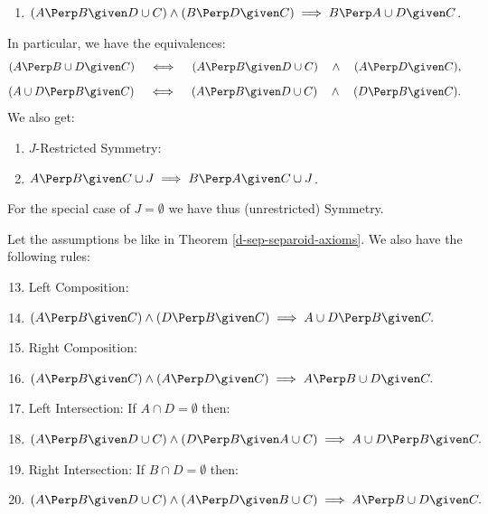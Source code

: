 \begin{DefThm}
\begin{enumerate}[label=\alph*)]
\item[] $ (A \Perp  B \given D \cup C) \land (B \Perp  D \given C) \implies B \Perp  A \cup D \given C$.
\end{enumerate}
In particular, we have the equivalences:
$$ (A \Perp  B \cup D \given C) \quad\iff\quad (A \Perp  B \given D \cup C) \quad\land\quad (A \Perp  D \given C)  ,$$
$$ (A \cup D \Perp  B \given C) \quad\iff\quad (A \Perp  B \given D \cup C) \quad\land\quad (D \Perp  B \given C).$$
We also get:
\begin{enumerate}[resume,label=\alph*)]
    \item $J$-Restricted Symmetry: 
	\item[] $A \Perp  B \given C \cup J \implies B \Perp A \given C \cup J$. 
\end{enumerate}
For the special case of $J=\emptyset$ we have thus (unrestricted) Symmetry.
\end{DefThm}


\begin{Rem}
Let the assumptions be like in Theorem \ref{d-sep-separoid-axioms}.
    We also have the following rules: 
    \begin{enumerate}[resume,label=\alph*)]
        \setcounter{enumi}{12}
        \item Left Composition:
        \item[] $(A \Perp  B \given  C) \land (D \Perp  B \given C) \implies A \cup D \Perp  B \given C.$
        \item Right Composition:
        \item[] $(A \Perp  B \given  C) \land (A \Perp  D \given C) \implies A \Perp  B \cup  D \given C.$
         \item Left Intersection: If $A \cap D = \emptyset$ then:
        \item[] $(A \Perp  B \given D \cup  C) \land (D \Perp  B \given A \cup C) \implies A \cup D \Perp  B \given C.$       
        \item Right Intersection: If $B \cap D = \emptyset$ then:
        \item[] $(A \Perp  B \given D \cup  C) \land (A \Perp  D \given B \cup C) \implies A \Perp  B \cup D \given C.$
    \end{enumerate}
\end{Rem}
